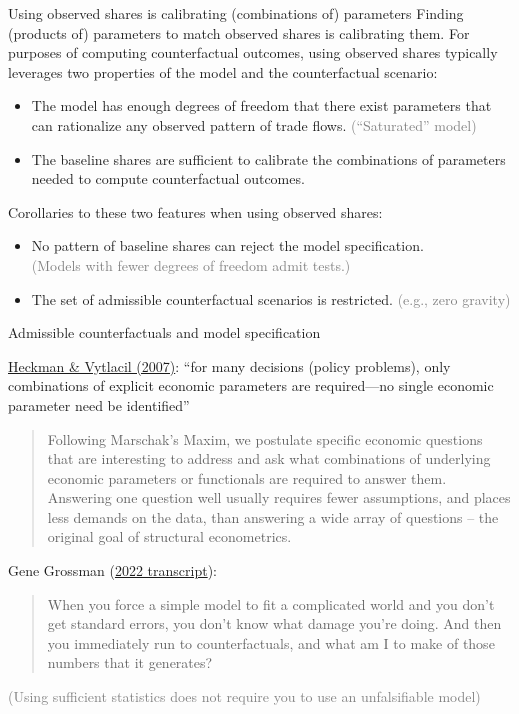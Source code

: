 \documentclass[11pt,notes=hide,aspectratio=169]{beamer}
\begin{document}
\begin{frame}{Using observed shares is calibrating (combinations of) parameters}
Finding (products of) parameters to match observed shares is calibrating them.
\medskip
For purposes of computing counterfactual outcomes, using observed shares typically leverages two properties of the model and the counterfactual scenario:
\begin{itemize}
\item
The model has enough degrees of freedom that there exist parameters that can rationalize any observed pattern of trade flows.
\textcolor{gray}{(``Saturated'' model)}
\item
The baseline shares are sufficient to calibrate the combinations of parameters needed to compute counterfactual outcomes.
\end{itemize}
\medskip
Corollaries to these two features when using observed shares:
\begin{itemize}
\item
No pattern of baseline shares can reject the model specification.\\
\textcolor{gray}{(Models with fewer degrees of freedom admit tests.)}
\item
The set of admissible counterfactual scenarios is restricted.
\textcolor{gray}{(e.g., zero gravity)}
\end{itemize}
\end{frame}
\begin{frame}{Admissible counterfactuals and model specification}
{\href{https://doi.org/10.1016/S1573-4412(07)06070-9}{Heckman \& Vytlacil (2007)}: ``for many decisions (policy problems), only combinations of explicit economic parameters are required—no single economic parameter need be identified''\par}
\begin{quote}{\small
	Following Marschak's Maxim, we postulate specific economic questions that are interesting to address and ask what combinations of underlying economic parameters or functionals are required to answer them. Answering one question well usually requires fewer assumptions, and places less demands on the data, than answering a wide array of questions -- the original goal of structural econometrics.\par
}\end{quote}
Gene Grossman (\href{https://economics.princeton.edu/news/alumni-conversations-gene-grossman-and-mits-david-atkin}{2022 transcript}):
\begin{quote}{\small
When you force a simple model to fit a complicated world and you don't get standard errors, you don't know what damage you're doing. And then you immediately run to counterfactuals, and what am I to make of those numbers that it generates?\par}\end{quote}
\textcolor{gray}{(Using sufficient statistics does not require you to use an unfalsifiable model)}
\end{frame}
\end{document}
